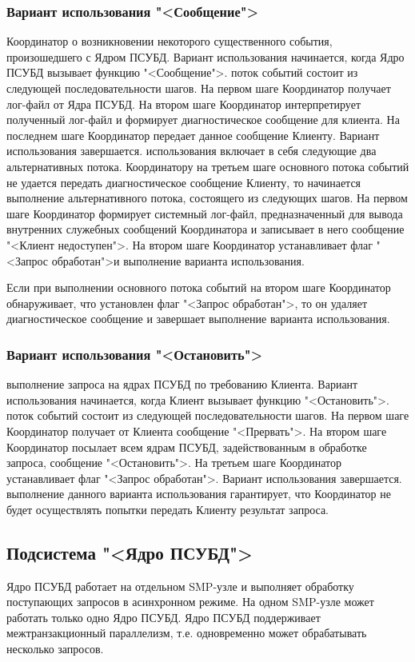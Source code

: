 \documentclass[11pt,oneside]{article}
\begin{document}
	\subsubsection{Вариант использования "<Сообщение">}
	 Координатор о возникновении некоторого существенного события, произошедшего с Ядром ПСУБД. Вариант использования начинается, когда Ядро ПСУБД вызывает функцию "<Сообщение">.
	 поток событий состоит из следующей последовательности шагов. На первом шаге Координатор получает лог-файл от Ядра ПСУБД. На втором шаге Координатор интерпретирует полученный лог-файл и формирует диагностическое сообщение для клиента. На последнем шаге Координатор передает данное сообщение Клиенту. Вариант использования завершается.
	 использования включает в себя следующие два альтернативных потока.
	 Координатору на третьем шаге основного потока событий не удается передать диагностическое сообщение Клиенту, то начинается выполнение альтернативного потока, состоящего из следующих шагов. На первом шаге Координатор формирует системный лог-файл, предназначенный для вывода внутренних служебных сообщений Координатора и записывает в него сообщение "<Клиент недоступен">. На втором шаге Координатор устанавливает флаг "<Запрос обработан">и  выполнение варианта использования.
	\par Если при выполнении основного потока событий на втором шаге Координатор обнаруживает, что установлен флаг "<Запрос обработан">, то он удаляет диагностическое сообщение и завершает выполнение варианта использования.
	
	\subsubsection{Вариант использования "<Остановить">}
	 выполнение запроса на ядрах ПСУБД по требованию Клиента. Вариант использования начинается, когда Клиент вызывает функцию "<Остановить">.
	 поток событий состоит из следующей последовательности шагов. На первом шаге Координатор получает от Клиента сообщение "<Прервать">. На втором шаге Координатор посылает всем ядрам ПСУБД, задействованным в обработке запроса, сообщение "<Остановить">. На третьем шаге Координатор устанавливает флаг "<Запрос обработан">. Вариант использования завершается.
	 выполнение данного варианта использования гарантирует, что Координатор не будет осуществлять попытки передать Клиенту результат запроса.
	
	\subsection{Подсистема "<Ядро ПСУБД">}\label{S_Kernel}
	Ядро ПСУБД работает на отдельном SMP-узле и выполняет обработку поступающих запросов в асинхронном режиме. На одном SMP-узле может работать только одно Ядро ПСУБД. Ядро ПСУБД поддерживает межтранзакционный параллелизм, т.е. одновременно может обрабатывать несколько запросов.
	
\end{document}
